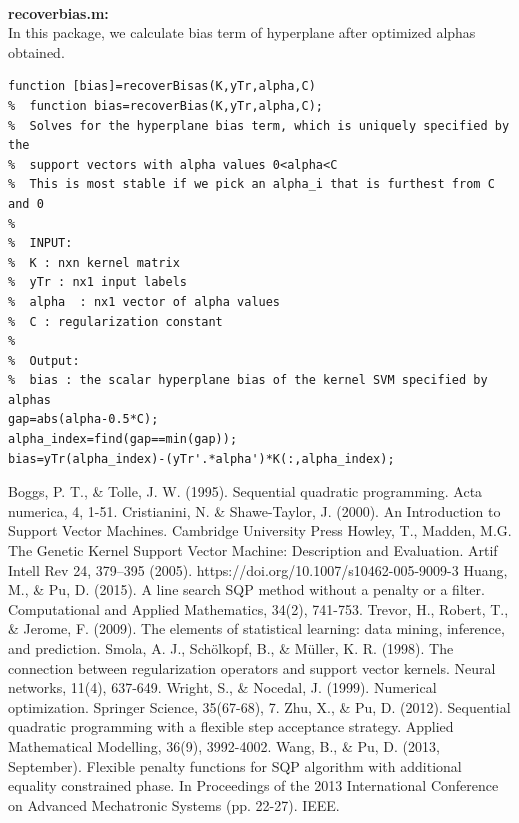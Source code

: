 \documentclass{article}
\begin{document}
\begin{spacing}{1.5}
~\\
\textbf{recoverbias.m:}\\
In this package, we calculate bias term of hyperplane after optimized alphas obtained.
\begin{lstlisting}
function [bias]=recoverBisas(K,yTr,alpha,C)
%  function bias=recoverBias(K,yTr,alpha,C);
%  Solves for the hyperplane bias term, which is uniquely specified by the 
%  support vectors with alpha values 0<alpha<C
%  This is most stable if we pick an alpha_i that is furthest from C and 0
%     
%  INPUT:
%  K : nxn kernel matrix
%  yTr : nx1 input labels
%  alpha  : nx1 vector of alpha values
%  C : regularization constant
%     
%  Output:
%  bias : the scalar hyperplane bias of the kernel SVM specified by alphas
gap=abs(alpha-0.5*C);
alpha_index=find(gap==min(gap));
bias=yTr(alpha_index)-(yTr'.*alpha')*K(:,alpha_index);
\end{lstlisting}




















\newpage
\begin{thebibliography}{99}
Boggs, P. T., \& Tolle, J. W. (1995). Sequential quadratic programming. Acta numerica, 4, 1-51.
Cristianini, N. \& Shawe-Taylor, J. (2000). An Introduction to Support Vector Machines. Cambridge University Press
Howley, T., Madden, M.G. The Genetic Kernel Support Vector Machine: Description and Evaluation. Artif Intell Rev 24, 379–395 (2005). https://doi.org/10.1007/s10462-005-9009-3
Huang, M., \& Pu, D. (2015). A line search SQP method without a penalty or a filter. Computational and Applied Mathematics, 34(2), 741-753.
Trevor, H., Robert, T., \& Jerome, F. (2009). The elements of statistical learning: data mining, inference, and prediction.
Smola, A. J., Schölkopf, B., \& Müller, K. R. (1998). The connection between regularization operators and support vector kernels. Neural networks, 11(4), 637-649.
Wright, S., \& Nocedal, J. (1999). Numerical optimization. Springer Science, 35(67-68), 7.
Zhu, X., \& Pu, D. (2012). Sequential quadratic programming with a flexible step acceptance strategy. Applied Mathematical Modelling, 36(9), 3992-4002.
Wang, B., \& Pu, D. (2013, September). Flexible penalty functions for SQP algorithm with additional equality constrained phase. In Proceedings of the 2013 International Conference on Advanced Mechatronic Systems (pp. 22-27). IEEE.


\end{thebibliography}

\end{spacing}
\end{document}
